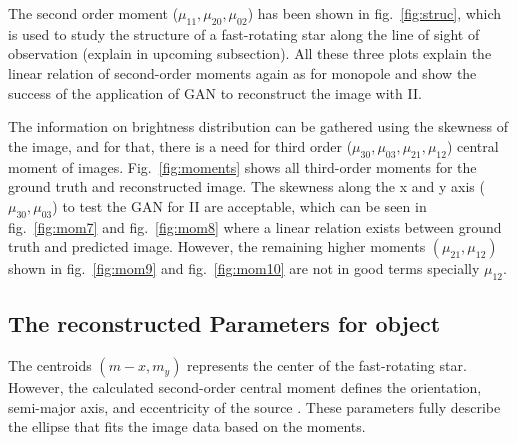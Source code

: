 The second order moment ($\mu_{11}, \mu_{20}, \mu_{02}$) has been shown in fig.~\ref{fig:struc}, which is used to study the structure of a fast-rotating star along the line of sight of observation (explain in upcoming subsection). All these three plots explain the linear relation of second-order moments again as for monopole and show the success of the application of GAN to reconstruct the image with II.

The information on brightness distribution can be gathered using the skewness of the image, and for that, there is a need for third order ($\mu_{30}, \mu_{03}, \mu_{21}, \mu_{12}$) central moment of images. Fig.~\ref{fig:moments} shows all third-order moments for the ground truth and reconstructed image. The skewness along the x and y axis ($\mu_{30}, \mu_{03}$) to test the GAN for II are acceptable, which can be seen in fig.~\ref{fig:mom7} and fig.~\ref{fig:mom8} where a linear relation exists between ground truth and predicted image. However, the remaining higher moments $(\mu_{21}, \mu_{12})$ shown in fig.~\ref{fig:mom9} and fig.~\ref{fig:mom10} are not in good terms specially $\mu_{12}$.

\subsection{The reconstructed Parameters for object}
The centroids $(m-x, m_y)$ represents the center of the fast-rotating star. However, the calculated second-order central moment defines the orientation, semi-major axis, and eccentricity of the source \citep{teague1980image}. These parameters fully describe the ellipse that fits the image data based on the moments. 

